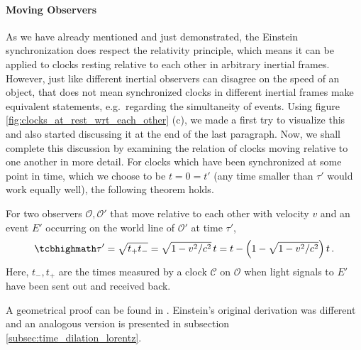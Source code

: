 			\paragraph{Moving Observers}
As we have already mentioned and just demonstrated, the Einstein synchronization does respect the relativity principle, which means it can be applied to clocks resting relative to each other in arbitrary inertial frames. However, just like different inertial observers can disagree on the speed of an object, that does not mean synchronized clocks in different inertial frames make equivalent statements, e.g.~regarding the simultaneity of events. Using figure \ref{fig:clocks_at_rest_wrt_each_other} (c), we made a first try to visualize this and also started discussing it at the end of the last paragraph. Now, we shall complete this discussion by examining the relation of clocks moving relative to one another in more detail. For clocks which have been synchronized at some point in time, which we choose to be $t = 0 = t'$ (any time smaller than $\tau'$ would work equally well), the following theorem holds.
\begin{thm}\label{thm:minkowski_moving_clocks}
	For two observers $\mathcal{O}, \mathcal{O}'$ that move relative to each other with velocity $v$ and an event $E'$ occurring on the world line of $\mathcal{O}'$ at time $\tau'$,
	\begin{equation}\label{eq:minkowski_theorem}
		\eqbox{
		\tau' = \sqrt{t_+ t_-} = \sqrt{1 - v^2 / c^2} \, t = t - \qty(1 - \sqrt{1 - v^2 / c^2}) \, t
		} \, .
	\end{equation}
	Here, $t_-, t_+$ are the times measured by a clock $\mathcal{C}$ on $\mathcal{O}$ when light signals to $E'$ have been sent out and received back.
\end{thm}
A geometrical proof can be found in \cite{dragon_geometry_srt}. Einstein's original derivation was different and an analogous version is presented in subsection \ref{subsec:time_dilation_lorentz}.



